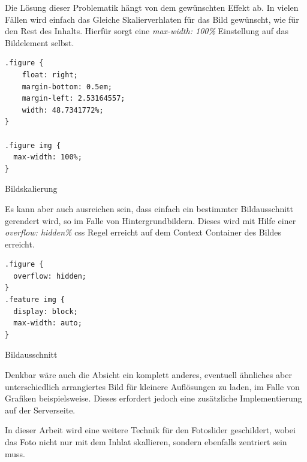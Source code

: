 Die Lösung dieser Problematik hängt von dem gewünschten Effekt ab. In vielen Fällen wird einfach das Gleiche Skalierverhlaten für das Bild gewünscht, wie für den Rest des Inhalts. Hierfür sorgt eine \emph{max-width: 100\%} Einstellung auf das Bildelement selbst. 

\begin{listing}[H]
\begin{verbatim}
.figure {
    float: right;
    margin-bottom: 0.5em;
    margin-left: 2.53164557;
    width: 48.7341772%;
}

.figure img {
  max-width: 100%;
}
\end{verbatim}
\caption{Bildskalierung}
\label{lst:scalable_image}
\end{listing}


Es kann aber auch ausreichen sein, dass einfach ein bestimmter Bildausschnitt gerendert wird, so im Falle von Hintergrundbildern. Dieses wird mit Hilfe einer \emph{overflow: hidden\%} css Regel erreicht auf dem Context Container des Bildes erreicht. 

\begin{listing}[H]
\begin{verbatim}
.figure {
  overflow: hidden;
}
.feature img {
  display: block;
  max-width: auto;
}
\end{verbatim}
\caption{Bildausschnitt}
\label{lst:cropped_image}
\end{listing}

Denkbar wäre auch die Absicht ein komplett anderes, eventuell ähnliches aber unterschiedlich arrangiertes Bild für kleinere Auflösungen zu laden, im Falle von Grafiken beispielsweise. Dieses erfordert jedoch eine zusätzliche Implementierung auf der Serverseite.

In dieser Arbeit wird eine weitere Technik für den Fotoslider geschildert, wobei das Foto nicht nur mit dem Inhlat skallieren, sondern ebenfalls zentriert sein muss.


